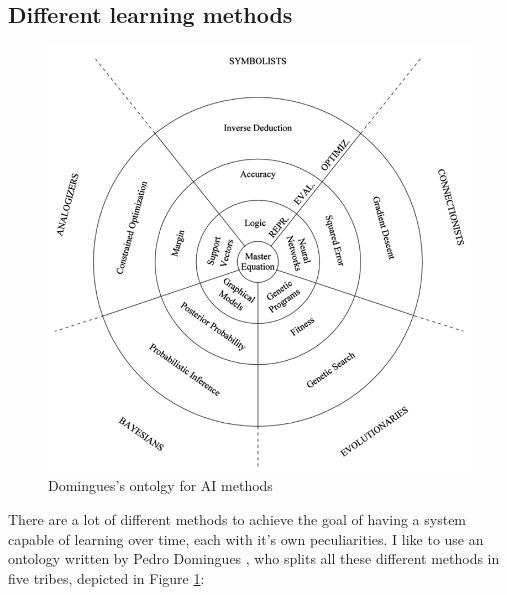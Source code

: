 \documentclass[11pt,a4paper,titlepage]{book}
\begin{document}
\subsection{Different learning methods}
\begin{figure}[ht]
    \includegraphics[scale=0.55]{imgs/ch_1/master_algo_ontology.png}
    \centering
    \caption{Domingues's ontolgy for AI methods}
    \label{master_algo_ontology}
\end{figure}
There are a lot of different methods to achieve the goal of having a system capable of learning over time, each with it's own peculiarities. I like to use an ontology written by Pedro Domingues \cite{master_algo}, who splits all these different methods in five tribes, depicted in Figure \ref{master_algo_ontology}:
\end{document}
